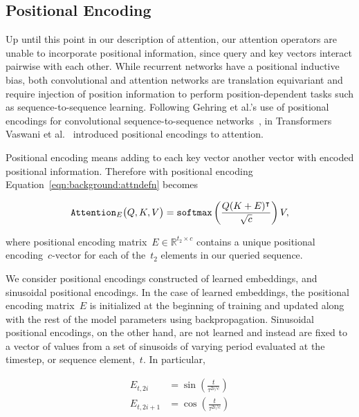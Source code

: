 \subsection{Positional Encoding}

Up until this point in our description of attention, our attention operators
are unable to incorporate positional information, since query and key vectors
interact pairwise with each other.
While recurrent networks have a positional inductive bias, both convolutional
and attention networks are translation equivariant and require injection of
position information to perform position-dependent tasks such as
sequence-to-sequence learning.
Following Gehring et al.'s use of positional encodings for convolutional
sequence-to-sequence networks~\cite{gehring2017convolutional}, in Transformers
Vaswani et al.~\cite{vaswani2017attention} introduced positional encodings to
attention.

Positional encoding means adding to each key vector another vector with encoded
positional information.
Therefore with positional encoding Equation~\ref{eqn:background:attndefn} becomes

\begin{equation}
\mathtt{Attention}_E\big(Q, K, V\big) = \mathtt{softmax}{}\left(\frac{Q(K + E)^\intercal}{\sqrt{c}}\right) V,
\label{eqn:background:posenc-attn}
\end{equation}

\noindent where positional encoding matrix~$E \in \mathbb{R}^{t_2\times c}$ contains a
unique positional encoding~$c$-vector for each of the~$t_2$ elements in our
queried sequence.

We consider positional encodings constructed of learned embeddings, and sinusoidal
positional encodings.
In the case of learned embeddings, the positional encoding matrix~$E$ is
initialized at the beginning of training and updated along with the rest of the
model parameters using backpropagation.
Sinusoidal positional encodings, on the other hand, are not learned and instead
are fixed to a vector of values from a set of sinusoids of varying period
evaluated at the timestep, or sequence element,~$t$.
In particular,

\begin{equation}
\begin{split}
E_{t, 2i} &= \sin\left(\frac{t}{\tau^{2i/c}}\right) \\
E_{t, 2i + 1} &= \cos\left(\frac{t}{\tau^{2i/c}}\right)
\end{split}
\end{equation}

